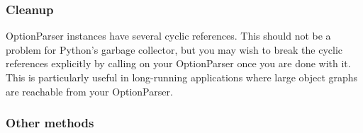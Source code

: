 \subsubsection{Cleanup\label{optparse-cleanup}}

OptionParser instances have several cyclic references.  This should not
be a problem for Python's garbage collector, but you may wish to break
the cyclic references explicitly by calling  on your
OptionParser once you are done with it.  This is particularly useful in
long-running applications where large object graphs are reachable from
your OptionParser.


\subsubsection{Other methods\label{optparse-other-methods}}

